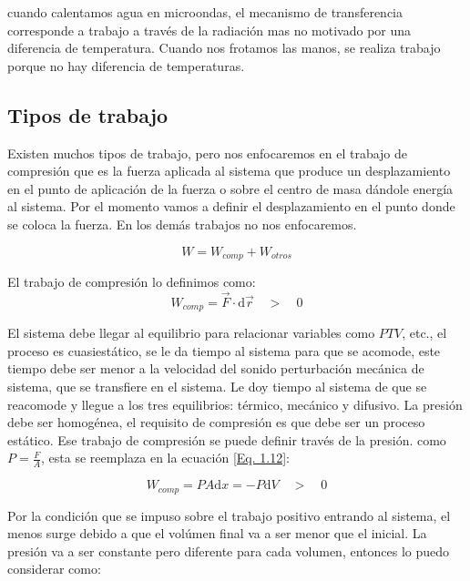 \documentclass[11pt,fleqn]{book}
\begin{document}
\begin{example}
cuando calentamos agua en microondas, el mecanismo de transferencia corresponde a trabajo a través de la radiación mas no motivado por una diferencia de temperatura. Cuando nos frotamos las manos, se realiza trabajo porque no hay diferencia de temperaturas. 
\end{example}

\subsection{Tipos de trabajo}

Existen muchos tipos de trabajo, pero nos enfocaremos en el trabajo de compresión que es la fuerza aplicada al sistema que produce un desplazamiento en el punto de aplicación de la fuerza o sobre el centro de masa dándole energía al sistema. Por el momento vamos a definir el desplazamiento en el punto donde se coloca la fuerza. En los demás trabajos no nos enfocaremos.

\begin{equation}
    W=W_{comp}+W_{otros}
    \label{Eq. 1.11}
\end{equation}

El trabajo de compresión lo definimos como:
\begin{equation}
    W_{comp}=\Vec{F}\cdot\mathrm{d}\Vec{r}\quad>\quad0
    \label{Eq. 1.12}
\end{equation}

El sistema debe llegar al equilibrio para relacionar variables como $PTV$, etc., el proceso es cuasiestático, se le da tiempo al sistema para que se acomode, este tiempo debe ser menor a la velocidad del sonido perturbación mecánica de sistema, que se transfiere en el sistema. Le doy tiempo al sistema de que se reacomode y llegue a los tres equilibrios: térmico, mecánico y difusivo. La presión debe ser homogénea, el requisito de compresión es que debe ser un proceso estático. Ese trabajo de compresión se puede definir través de la presión. como $P=\frac{F}{A}$, esta se reemplaza en la ecuación \ref{Eq. 1.12}: 

\begin{equation*}
    W_{comp}=PA\mathrm{d}x=-P\mathrm{d}V\quad>\quad0
\end{equation*}

Por la condición que se impuso sobre el trabajo positivo entrando al sistema, el menos surge debido a que el volúmen final va a ser menor que el inicial. La presión va a ser constante pero diferente para cada volumen, entonces lo puedo considerar como:
\end{document}
